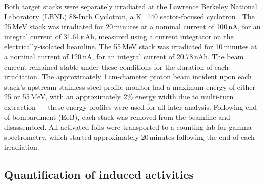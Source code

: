 Both target stacks were 
separately irradiated at the  Lawrence Berkeley National Laboratory  (LBNL)
88-Inch Cyclotron, a  K=140 sector-focused cyclotron \cite{7999622}.
The 25\,MeV stack was irradiated for 
20\,minutes at a nominal current of 100\,nA,  for an  integral current of 31.61\,nAh, measured using a current integrator on the electrically-isolated beamline. 
The 55\,MeV stack was irradiated for 
10\,minutes at a nominal current of 120\,nA,  for an  integral current of 20.78\,nAh. 
The beam current
remained stable under these conditions for the duration of each irradiation.
The approximately 1\,cm-diameter proton beam incident upon each stack's upstream stainless steel profile monitor had a maximum energy of either 25 or 55\,MeV, with an approximately 2\% energy width due to multi-turn extraction --- these energy profiles were used for all later analysis.
Following end-of-bombardment (EoB), each stack was removed from the beamline and disassembled.
All activated foils were transported to a counting lab for gamma spectrometry, which started approximately 20\,minutes following the end of each irradiation.





\subsection{\label{sec:spectroscopy_fe}Quantification of induced activities}


